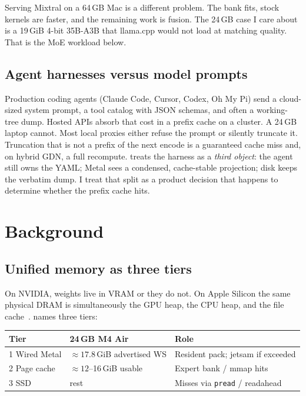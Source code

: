 Serving Mixtral on a 64\,GB Mac is a different problem. The bank fits, stock kernels are faster, and the remaining work is fusion. The 24\,GB case I care about is a 19\,GiB 4-bit 35B-A3B that llama.cpp would not load at matching quality. That is the MoE workload below.

\subsection{Agent harnesses versus model prompts}

Production coding agents (Claude Code, Cursor, Codex, Oh My Pi) send a cloud-sized system prompt, a tool catalog with JSON schemas, and often a working-tree dump. Hosted APIs absorb that cost in a prefix cache on a cluster. A 24\,GB laptop cannot. Most local proxies either refuse the prompt or silently truncate it. Truncation that is not a prefix of the next encode is a guaranteed cache miss and, on hybrid GDN, a full recompute. \slotbank{} treats the harness as a \emph{third object}: the agent still owns the YAML; Metal sees a condensed, cache-stable projection; disk keeps the verbatim dump. I treat that split as a product decision that happens to determine whether the prefix cache hits.

\section{Background}
\label{sec:bg}

\subsection{Unified memory as three tiers}
\label{sec:tiers}

On NVIDIA, weights live in VRAM or they do not. On Apple Silicon the same physical DRAM is simultaneously the GPU heap, the CPU heap, and the file cache~\citep{appleum}. \slotbank{} names three tiers:

\begin{center}
\begin{tabular}{@{}llp{7.6cm}@{}}
\toprule
Tier & 24\,GB M4 Air & Role \\
\midrule
1 Wired Metal & $\approx 17.8$\,GiB advertised WS & Resident pack; jetsam if exceeded \\
2 Page cache & $\approx 12$--16\,GiB usable & Expert bank / mmap hits \\
3 SSD & rest & Misses via \texttt{pread} / readahead \\
\bottomrule
\end{tabular}
\end{center}


